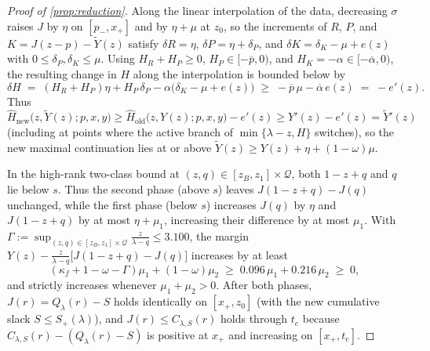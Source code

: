 \documentclass[11pt]{article}
\numberwithin{equation}{section}
\theoremstyle{plain}
\theoremstyle{definition}
\newcommand{\1}{\mathbf{1}}
\newcommand{\calQ}{\mathcal{Q}}
\begin{document}
\begin{proof}[Proof of {\cref{prop:reduction}}]
Along the linear interpolation of the data, decreasing $\sigma$ raises $J$ by $\eta$ on $[p_-, x_+]$ and by $\eta + \mu$ at $z_0$, so the increments of $R$, $P$, and $K = J(z - p) - \widetilde{Y}(z)$ satisfy $\delta R = \eta$, $\delta P = \eta + \delta_P$, and $\delta K = \delta_K - \mu + e(z)$ with $0 \le \delta_P, \delta_K \le \mu$. Using $H_R + H_P \ge 0$, $H_P \in [-\overline{p}, 0)$, and $H_K = -\alpha \in [-\overline{\alpha}, 0)$, the resulting change in $H$ along the interpolation is bounded below by
\[
  \delta H \;=\; (H_R + H_P)\eta + H_P\,\delta_P - \alpha\bigl(\delta_K - \mu + e(z)\bigr)
  \;\ge\; -\overline{p}\,\mu - \overline{\alpha}\,e(z) \;=\; -e'(z).
\]
Thus $\widehat{H}_{\mathrm{new}}\bigl(z, \widetilde{Y}(z); p, x, y\bigr) \ge \widehat{H}_{\mathrm{old}}\bigl(z, Y(z); p, x, y\bigr) - e'(z) \ge Y'(z) - e'(z) = \widetilde{Y}'(z)$ (including at points where the active branch of $\min\{\lambda - z, H\}$ switches), so the new maximal continuation lies at or above $\widetilde{Y}(z) \ge Y(z) + \eta + (1 - \omega)\mu$.

In the high-rank two-class bound at $(z, q) \in [z_B, z_1] \times \calQ$, both $1 - z + q$ and $q$ lie below $s$. Thus the second phase (above $s$) leaves $J(1 - z + q) - J(q)$ unchanged, while the first phase (below $s$) increases $J(q)$ by $\eta$ and $J(1 - z + q)$ by at most $\eta + \mu_1$, increasing their difference by at most $\mu_1$. With $\Gamma := \sup_{(z, q) \in [z_B, z_1] \times \calQ} \frac{z}{\lambda - q} \le 3.100$, the margin $Y(z) - \frac{z}{\lambda - q}\bigl[J(1 - z + q) - J(q)\bigr]$ increases by at least
\[
  (\kappa_f + 1 - \omega - \Gamma)\mu_1 + (1 - \omega)\mu_2 \;\ge\; 0.096\,\mu_1 + 0.216\,\mu_2 \;\ge\; 0,
\]
and strictly increases whenever $\mu_1 + \mu_2 > 0$. After both phases, $J(r) = Q_\lambda(r) - S$ holds identically on $[x_+, z_0]$ (with the new cumulative slack $S \le S_+(\lambda)$), and $J(r) \le C_{\lambda, S}(r)$ holds through $t_e$ because $C_{\lambda, S}(r) - (Q_\lambda(r) - S)$ is positive at $x_+$ and increasing on $[x_+, t_e]$.


\end{proof}
\end{document}
